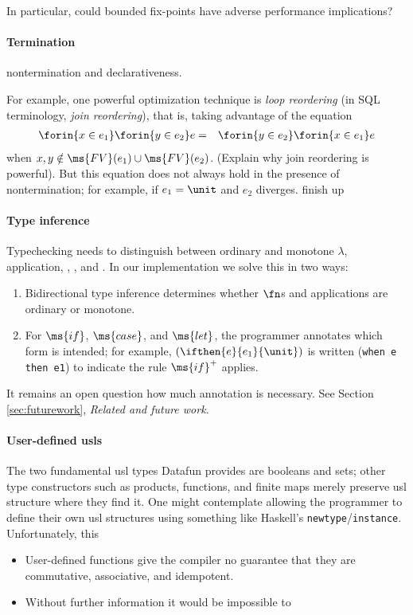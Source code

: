\documentclass[preprint]{sigplanconf}
\begin{document}
\TODO In particular, could bounded fix-points have adverse performance
implications?

\paragraph{Termination} \TODO nontermination and declarativeness.

For example, one powerful optimization technique is \emph{loop reordering} (in
SQL terminology, \emph{join reordering}), that is, taking advantage of the
equation
\begin{eqnarray*}
  \forin{x \in e_1} \forin{y \in e_2} e
  &=& \forin{y \in e_2} \forin{x \in e_1} e
\end{eqnarray*}
when $x,y \notin \ms{FV}(e_1) \cup \ms{FV}(e_2)$. (\TODO Explain why join
reordering is powerful). But this equation does not always hold in the presence
of nontermination; for example, if $e_1 = \unit$ and $e_2$ diverges. \TODO
finish up

\paragraph{Type inference} Typechecking needs to distinguish between ordinary
and monotone $\lambda$, application, , , and . In our
implementation we solve this in two ways:
\begin{enumerate}
\item Bidirectional type inference  determines whether $\fn$s and
  applications are ordinary or monotone.
\item For $\ms{if}$, $\ms{case}$, and $\ms{let}$, the programmer annotates which
  form is intended; for example, $(\ifthen{e}{e_1}{\unit})$ is written
  (\texttt{when e then e1}) to indicate the rule $\ms{if}^+$ applies.
\end{enumerate}

It remains an open question how much annotation is necessary. See
Section \ref{sec:futurework}, \emph{Related and future work}.

\paragraph{User-defined usls}
The two fundamental usl types Datafun provides are booleans and sets; other type
constructors such as products, functions, and finite maps merely preserve usl
structure where they find it. One might contemplate allowing the programmer to
define their own usl structures using something like Haskell's
\texttt{newtype}/\texttt{instance}. Unfortunately, this \TODO
\begin{itemize}
\item User-defined functions give the compiler no guarantee that they are
  commutative, associative, and idempotent.
\item Without further information it would be impossible to
\end{itemize}
\end{document}
